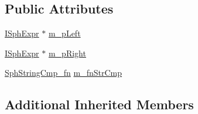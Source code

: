 \subsection*{Public Attributes}
\begin{DoxyCompactItemize}
\item 
\hyperlink{structISphExpr}{I\-Sph\-Expr} $\ast$ \hyperlink{structExpr__StrEq__c_acb26cbc98dc8c1c403188b7adbcaaf9c}{m\-\_\-p\-Left}
\item 
\hyperlink{structISphExpr}{I\-Sph\-Expr} $\ast$ \hyperlink{structExpr__StrEq__c_aa55ab956b92f40c7f6171c36983361c2}{m\-\_\-p\-Right}
\item 
\hyperlink{sphinx_8h_a564bff07e446e0e31a63004937e8347b}{Sph\-String\-Cmp\-\_\-fn} \hyperlink{structExpr__StrEq__c_af26a5bc02b48130aa1d8f1bf999ba45b}{m\-\_\-fn\-Str\-Cmp}
\end{DoxyCompactItemize}
\subsection*{Additional Inherited Members}


